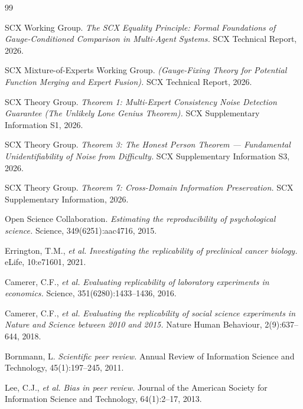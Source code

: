 \documentclass[12pt,a4paper]{article}
\theoremstyle{remark}
\begin{document}
\begin{thebibliography}{99}

SCX Working Group.
\textit{The SCX Equality Principle: Formal Foundations of Gauge-Conditioned Comparison in Multi-Agent Systems.}
SCX Technical Report, 2026.

SCX Mixture-of-Experts Working Group.
\textit{ (Gauge-Fixing Theory for Potential Function Merging and Expert Fusion).}
SCX Technical Report, 2026.

SCX Theory Group.
\textit{Theorem 1: Multi-Expert Consistency Noise Detection Guarantee (The Unlikely Lone Genius Theorem).}
SCX Supplementary Information S1, 2026.

SCX Theory Group.
\textit{Theorem 3: The Honest Person Theorem — Fundamental Unidentifiability of Noise from Difficulty.}
SCX Supplementary Information S3, 2026.

SCX Theory Group.
\textit{Theorem 7: Cross-Domain Information Preservation.}
SCX Supplementary Information, 2026.

Open Science Collaboration.
\textit{Estimating the reproducibility of psychological science.}
Science, 349(6251):aac4716, 2015.

Errington, T.M., \textit{et al.}
\textit{Investigating the replicability of preclinical cancer biology.}
eLife, 10:e71601, 2021.

Camerer, C.F., \textit{et al.}
\textit{Evaluating replicability of laboratory experiments in economics.}
Science, 351(6280):1433--1436, 2016.

Camerer, C.F., \textit{et al.}
\textit{Evaluating the replicability of social science experiments in Nature and Science between 2010 and 2015.}
Nature Human Behaviour, 2(9):637--644, 2018.

Bornmann, L.
\textit{Scientific peer review.}
Annual Review of Information Science and Technology, 45(1):197--245, 2011.

Lee, C.J., \textit{et al.}
\textit{Bias in peer review.}
Journal of the American Society for Information Science and Technology, 64(1):2--17, 2013.


\end{thebibliography}
\end{document}
